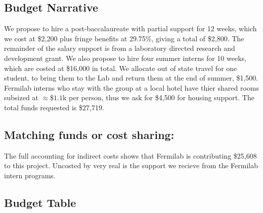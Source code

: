 
\subsection{Budget Narrative}


%

We propose to hire a post-baccalaureate with partial support for 12 weeks, which we cost at \$2,200 
plus fringe benefits at 29.75\%, giving a total of \$2,800.  The remainder of the salary
support is from a laboratory directed research and development grant. 
We also propose to hire four summer interns for 10 weeks, which are costed at \$16,000 in total.  
We allocate out of state travel for one student, to bring them to the Lab and return them at the
end of summer, \$1,500. Fermilab interns who stay with the group at a local hotel have thier
shared rooms subsized at $\approx \$1.1$k per person, thus we ask for \$4,500 for housing support.
The total funds requested is \$27,719.



\subsection{Matching funds or cost sharing:}
The full accounting for indirect costs shows that Fermilab is contributing \$25,608 to this
project. Uncosted by very real is the support we recieve from the Fermilab intern programs.

\newpage
\subsection{Budget Table}


